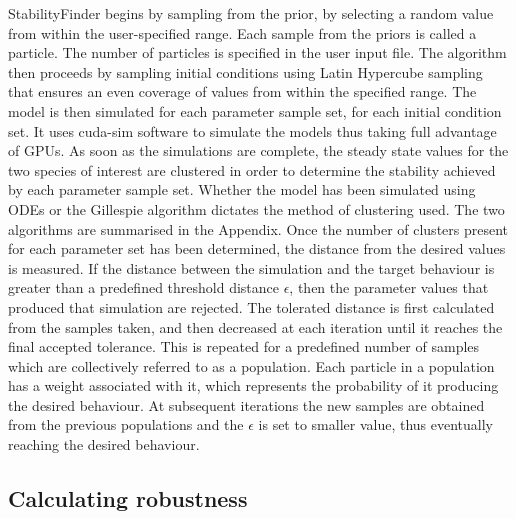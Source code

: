 StabilityFinder begins by sampling from the prior, by selecting a random value from within the user-specified range. Each sample from the priors is called a particle. The number of particles is specified in the user input file. The algorithm then proceeds by sampling initial conditions using Latin Hypercube sampling that ensures an even coverage of values from within the specified range. The model is then simulated for each parameter sample set, for each initial condition set.  It uses cuda-sim software \autocite{Zhou:2011hp} to simulate the models thus taking full advantage of GPUs.  As soon as the simulations are complete, the steady state values for the two species of interest are clustered in order to determine the stability achieved by each parameter sample set. Whether the model has been simulated using ODEs or the Gillespie algorithm dictates the method of clustering used. The two algorithms are summarised in the Appendix. Once the number of clusters present for each parameter set has been determined, the distance from the desired values is measured. If the distance between the simulation and the target behaviour is greater than a predefined threshold distance $\epsilon$, then the parameter values that produced that simulation are rejected. The tolerated distance is first calculated from the samples taken, and then decreased at each iteration until it reaches the final accepted tolerance. This is repeated for a predefined number of samples which are collectively referred to as a population. Each particle in a population has a weight associated with it, which represents the probability of it producing the desired behaviour. At subsequent iterations the new samples are obtained from the previous populations and the $\epsilon$ is set to smaller value, thus eventually reaching the desired behaviour. 
 
\subsection{Calculating robustness}

